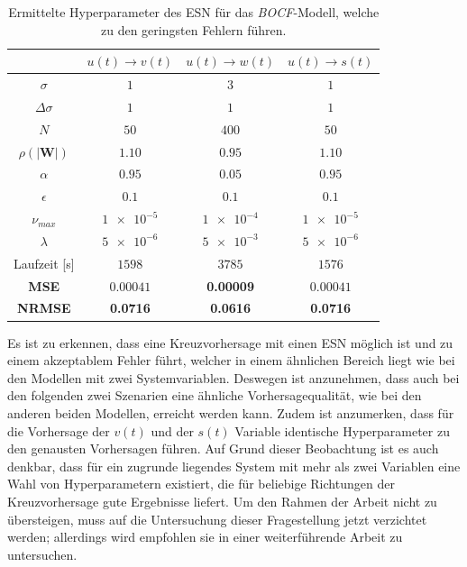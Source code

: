 \begin{table}[h]
	\centering
	\captionsetup{width=0.9\linewidth}
	\begin{tabular}{cccc}
		\hline		
		\multicolumn{1}{c}{} &  $u(t) \rightarrow v(t)$ & $u(t) \rightarrow w(t)$ & $u(t) \rightarrow s(t)$\\ 
		\hline 
		\rule[-1ex]{0pt}{2.5ex} $\sigma$ & $1$ & $3$ & $1$\\ 
		\rule[-1ex]{0pt}{2.5ex} $\Delta \sigma$ & $1$ & $1$ & $1$ \\ 
		\rule[-1ex]{0pt}{3.5ex} $N$ & $50$ & $400$ & $50$ \\ 
		\rule[-1ex]{0pt}{3.5ex} $\rho(|\mathbf{W}|)$ & $1.10$ & $0.95$ & $1.10$\\ 
		\rule[-1ex]{0pt}{3.5ex} $\alpha$ & $0.95$ & $0.05$ & $0.95$ \\ 
		\rule[-1ex]{0pt}{3.5ex} $\epsilon$ & $0.1$ & $0.1$ & $0.1$ \\ 
		\rule[-1ex]{0pt}{3.5ex} $\nu_{max}$ & $\num{1e-5}$ & $\num{1e-4}$ & $\num{1e-5}$\\ 
		\rule[-1ex]{0pt}{3.5ex} $\lambda$ & $\num{5e-6}$ & $\num{5e-3}$ & $\num{5e-6}$\\ 
		\rule[-1ex]{0pt}{2.5ex} Laufzeit [s] & $1598$ & $3785$ & $1576$ \\ 
		\rule[-1ex]{0pt}{2.5ex} \textbf{MSE} & \textbf{$\num{0.00041}$} & \textbf{0.00009} & $0.00041$ \\ 
		\rule[-1ex]{0pt}{2.5ex} \textbf{NRMSE} & \textbf{0.0716} & \textbf{0.0616} & \textbf{0.0716} \\ 
		\hline 
	\end{tabular} 
	\caption{Ermittelte Hyperparameter des \textsc{ESN} für das \textit{BOCF}-Modell, welche zu den geringsten Fehlern führen.}
	\label{tab:exp_cross_bocf_results}
\end{table}

Es ist zu erkennen, dass eine Kreuzvorhersage mit einen \textsc{ESN} möglich ist und zu einem akzeptablem Fehler führt, welcher in einem ähnlichen Bereich liegt wie bei den Modellen mit zwei Systemvariablen. Deswegen ist anzunehmen, dass auch bei den folgenden zwei Szenarien eine ähnliche Vorhersagequalität, wie bei den anderen beiden Modellen, erreicht werden kann. Zudem ist anzumerken, dass für die Vorhersage der $v(t)$ und der $s(t)$ Variable identische Hyperparameter zu den genausten Vorhersagen führen. Auf Grund dieser Beobachtung ist es auch denkbar, dass für ein zugrunde liegendes System mit mehr als zwei Variablen eine Wahl von Hyperparametern existiert, die für beliebige Richtungen der Kreuzvorhersage gute Ergebnisse liefert. Um den Rahmen der Arbeit nicht zu übersteigen, muss auf die Untersuchung dieser Fragestellung jetzt verzichtet werden; allerdings wird empfohlen sie in einer weiterführende Arbeit zu untersuchen.\\ 


